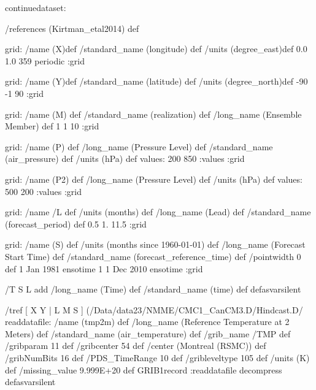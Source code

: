 \begin{ingrid}
continuedataset:

/references (Kirtman_etal2014) def

grid:
/name (X)def
/standard_name (longitude) def
/units (degree_east)def
 0.0 1.0 359
 periodic
:grid

grid:
/name (Y)def
/standard_name (latitude) def
/units (degree_north)def
-90 -1 90
:grid

grid:
/name (M) def
/standard_name (realization) def
/long_name (Ensemble Member) def
1 1 10
:grid

grid:
/name (P) def
/long_name (Pressure Level) def
/standard_name (air_pressure) def
/units (hPa) def
values: 200 850 :values
:grid

grid:
/name (P2) def
/long_name (Pressure Level) def
/units (hPa) def
values: 500 200 :values
:grid


grid:
/name /L def
/units (months) def
/long_name (Lead) def
/standard_name (forecast_period) def
0.5 1. 11.5
:grid

grid:
/name (S) def
/units (months since 1960-01-01) def
/long_name (Forecast Start Time) def
/standard_name (forecast_reference_time) def
/pointwidth 0 def
1 Jan 1981 ensotime
1
1 Dec 2010 ensotime
:grid

%

/T { S L add
/long_name (Time) def
/standard_name (time) def } defasvarsilent

/tref {
[ X Y | L M S ] (/Data/data23/NMME/CMC1_CanCM3.D/Hindcast.D/%
readdatafile: 
/name (tmp2m) def
/long_name (Reference Temperature at 2 Meters) def
/standard_name (air_temperature) def
/grib_name /TMP def
/gribparam 11 def
/gribcenter 54 def
/center (Montreal (RSMC)) def
/gribNumBits 16 def
/PDS_TimeRange 10 def
/gribleveltype 105 def
/units (K) def
/missing_value 9.999E+20 def
GRIB1record
:readdatafile decompress
} defasvarsilent


\end{ingrid}
